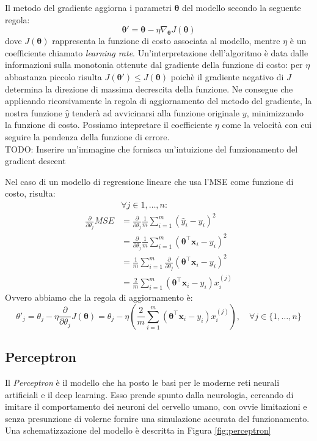 \documentclass{standalone}
\begin{document}
Il metodo del gradiente aggiorna i parametri $\bm \theta$ del modello secondo
la seguente regola: 
\begin{equation} \label{eq:grad-up}
  \bm \theta' = \bm \theta - \eta \nabla_{\bm \theta} J(\bm \theta) 
\end{equation}
dove $J(\bm \theta)$ rappresenta la funzione di costo associata al modello,
mentre $\eta$ è un coefficiente chiamato \emph{learning rate}.
Un'interpretazione dell'algoritmo è data dalle informazioni sulla monotonia
ottenute dal gradiente della funzione di costo: per $\eta$ abbastanza piccolo
risulta $J(\bm \theta') \leq J(\bm \theta)$ poichè il gradiente negativo di $J$
determina la direzione di massima decrescita della funzione\cite{goodfellow}.
Ne consegue che applicando ricorsivamente la regola di aggiornamento del metodo
del gradiente, la nostra funzione $\hat{y}$ tenderà ad avvicinarsi alla
funzione originale $y$, minimizzando la funzione di costo.
Possiamo intepretare il coefficiente $\eta$ come la velocità con cui seguire la
pendenza della funzione di errore. \\
{\large TODO: Inserire un'immagine che fornisca un'intuizione del
  funzionamento del gradient descent}

Nel caso di un modello di regressione lineare che usa l'MSE come funzione di
costo, risulta: 
\begin{align*}
  & \forall j \in {1, \dotsc, n}: \\
  \frac{\partial}{\partial\theta_j} MSE &= 
  \frac{\partial}{\partial\theta_j} \frac{1}{m} \sum_{i=1}^m{(\hat{y}_i -
    y_i)^2} \\ 
  &= \frac{\partial}{\partial\theta_j} \frac{1}{m}
  \sum_{i=1}^m{(\bm \theta^\intercal \bm x_i - y_i)^2} \\
  &= \frac{1}{m}
  \sum_{i=1}^m{\frac{\partial}{\partial\theta_j}(\bm \theta^\intercal \bm x_i -
    y_i)^2} \\
  &= \frac{2}{m}
  \sum_{i=1}^m{(\bm \theta^\intercal \bm x_i - y_i)x_i^{(j)}}
\end{align*}
%
Ovvero abbiamo che la regola di aggiornamento è:
$$ \theta'_j = \theta_j - \eta \frac{\partial}{\partial\theta_j} J(\bm \theta)
             = \theta_j - \eta (\frac{2}{m} 
             \sum_{i=1}^m{(\bm \theta^\intercal \bm x_i - y_i)x_i^{(j)}}),
             \quad \forall j \in \{1, \dotsc, n\}
$$

\subsection{Perceptron}
Il \emph{Perceptron} è il modello che ha posto le basi per le moderne reti
neurali artificiali e il deep learning. Esso prende spunto dalla neurologia,
cercando di imitare il comportamento dei neuroni del cervello umano, con ovvie
limitazioni e senza presunzione di volerne fornire una simulazione accurata del
funzionamento. Una schematizzazione del modello è descritta in Figura
\ref{fig:perceptron}

\end{document}
